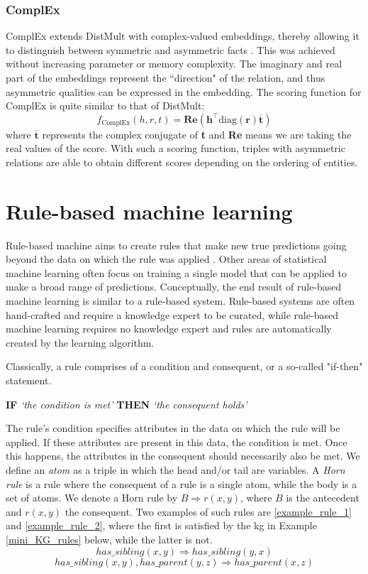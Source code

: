 \subsubsection{ComplEx}
ComplEx extends DistMult with complex-valued embeddings, thereby allowing it to distinguish between symmetric and asymmetric facts \cite{complEx}. This was achieved without increasing parameter or memory complexity. The imaginary and real part of the embeddings represent the ``direction" of the relation, and thus asymmetric qualities can be expressed in the embedding. The scoring function for ComplEx is quite similar to that of DistMult:
\[f_ {\text{ComplEx}}(h, r, t) =\textbf{Re}(\textbf{h}^{\top}\text{diag}(\textbf{r})\overline{\textbf{t}})\]
where $\overline{\textbf{t}}$ represents the complex conjugate of \textbf{t} and \textbf{Re} means we are taking the real values of the score. With such a scoring function, triples with asymmetric relations are able to obtain different scores depending on the ordering of entities.
    

\section{Rule-based machine learning}
Rule-based machine aims to create rules that make new true predictions going beyond the data on which the rule was applied \cite{weiss1995rule}. Other areas of statistical machine learning often focus on training a single model that can be applied to make a broad range of predictions. Conceptually, the end result of rule-based machine learning is similar to a rule-based system.  Rule-based systems are often hand-crafted and require a knowledge expert to be curated, while rule-based machine learning requires no knowledge expert and rules are automatically created by the learning algorithm.

Classically, a rule comprises of a condition and consequent, or a so-called "if-then" statement. \begin{center} \textbf{IF} \textit{`the condition is met'} \textbf{THEN} \textit{`the consequent holds'} \end{center}
The rule's condition specifies attributes in the data on which the rule will be applied. If these attributes are present in this data, the condition is met. Once this happens, the attributes in the consequent should necessarily also be met. We define an \textit{atom} as a triple in which the head and/or tail are variables. A \textit{Horn rule} is a rule where the consequent of a rule is a single atom, while the body is a set of atoms. We denote a Horn rule by $B \Rightarrow r(x, y)$, where $B$ is the antecedent and $r(x, y)$ the consequent. Two examples of such rules are \ref{example_rule_1} and \ref{example_rule_2}, where the first is satisfied by the \gls{kg} in Example \ref{mini_KG_rules} below, while the latter is not.
\begin{equation}
has\_sibling(x, y) \Rightarrow has\_sibling(y,x)
\label{example_rule_1}
\end{equation}
\begin{equation}
    has\_sibling(x, y), has\_parent(y,z) \Rightarrow has\_parent(x,z)
    \label{example_rule_2}
\end{equation}


